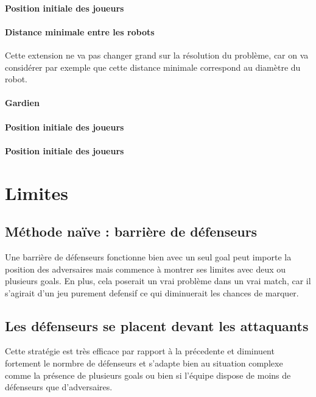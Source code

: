 \documentclass{article}
\begin{document}
\paragraph{Position initiale des joueurs}


\paragraph{Distance minimale entre les robots}
Cette extension ne va pas changer grand sur la résolution du problème, car on va considérer par exemple que cette distance minimale correspond au diamètre du robot.

\paragraph{Gardien}


\paragraph{Position initiale des joueurs}


\paragraph{Position initiale des joueurs}



\section{Limites}

\subsection{Méthode naïve : barrière de défenseurs}
Une barrière de défenseurs fonctionne bien avec un seul goal peut importe la position des adversaires
mais commence à montrer ses limites avec deux ou plusieurs goals.
En plus, cela poserait un vrai problème dans un vrai match, car il s'agirait d'un jeu purement defensif
ce qui diminuerait les chances de marquer.

\subsection{Les défenseurs se placent devant les attaquants}
Cette stratégie est très efficace par rapport à la précedente et diminuent fortement le normbre de défenseurs et
s'adapte bien au situation complexe comme la présence de plusieurs goals ou bien si l'équipe dispose de moins de
défenseurs que d'adversaires.
\end{document}
